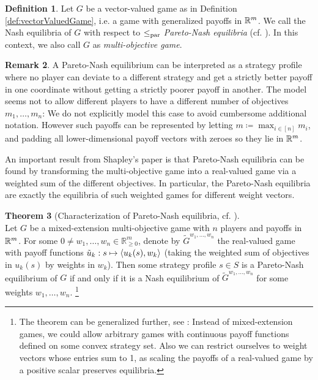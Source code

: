 \documentclass[a4paper]{scrreprt}
\newcommand{\Rp}{\mathbb{R}_{\geq 0}}
\theoremstyle{definition}
\newtheorem{thm}{Theorem}[chapter] %
\newtheorem{defn}[thm]{Definition} %
\newtheorem{rem}[thm]{Remark}
\begin{document}
    \begin{defn}
        Let $G$ be a vector-valued game as in Definition \ref{def:vectorValuedGame}, i.e. a game with generalized payoffs in $\mathbb{R}^m$.
        We call the Nash equilibria of $G$ with respect to $\leq_{\text{par}}$ \emph{Pareto-Nash equilibria} (cf. \cite{bib:paretoNashEquilibria}).
        In this context, we also call $G$ as \emph{multi-objective game}.
    \end{defn}

    \begin{rem}
        A Pareto-Nash equilibrium can be interpreted as a strategy profile where no player can deviate to a different strategy and get a strictly better payoff in one coordinate without getting a strictly poorer payoff in another. The model seems not to allow different players to have a different number of objectives $m_1, \dots, m_n$: We do not explicitly model this case to avoid cumbersome additional notation. However such payoffs can be represented by letting $m \coloneqq \max_{i \in [n]} m_i$, and padding all lower-dimensional payoff vectors with zeroes so they lie in $\mathbb{R}^m$.
    \end{rem}

    An important result from Shapley's paper \cite{bib:shapleyMultiobjectiveEquilibriumPoints} is that Pareto-Nash equilibria can be found by transforming the multi-objective game into a real-valued game via a weighted sum of the different objectives. In particular, the Pareto-Nash equilibria are exactly the equilibria of such weighted games for different weight vectors.
    
    \begin{thm}[Characterization of Pareto-Nash equilibria, cf. \cite{bib:shapleyMultiobjectiveEquilibriumPoints,bib:paretoNashEquilibria}]~\\
        Let $G$ be a mixed-extension multi-objective game with $n$ players and payoffs in $\mathbb{R}^m$. 
        For some $0 \neq w_1, \dots, w_n \in \Rp^m$, denote by $\tilde{G}^{w_1, \dots, w_n}$ the real-valued game with payoff functions
        $\tilde{u}_k: s \mapsto \left\langle u_k(s), w_k \right\rangle$ (taking the weighted sum of objectives in $u_k(s)$ by weights in $w_k$).
        Then some strategy profile $s \in S$ is a Pareto-Nash equilibrium of $G$ if and only if it is a Nash equilibrium of $\tilde{G}^{w_1, \dots, w_n}$ for some weights $w_1, \dots, w_n$.
        \footnote{The theorem can be generalized further, see \cite{bib:shapleyMultiobjectiveEquilibriumPoints,bib:paretoNashEquilibria}: Instead of mixed-extension games, we could allow arbitrary games with continuous payoff functions defined on some convex strategy set.
        Also we can restrict ourselves to weight vectors whose entries sum to 1, as scaling the payoffs of a real-valued game by a positive scalar preserves equilibria.
        }
        \label{thm:paretoNashEquilibriaWeightingCharacterization}
    \end{thm}
\end{document}
